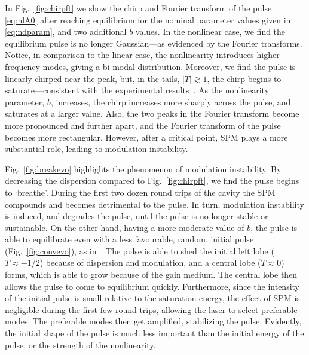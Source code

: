 \documentclass[9pt,twocolumn,twoside]{osajnl}
\begin{document}
In Fig.~\ref{fig:chirpft} we show the chirp and Fourier transform of the pulse \eqref{eq:nlA0} after reaching equilibrium for the nominal parameter values given in \eqref{eq:ndparam}, and two additional $b$ values. In the nonlinear case, we find the equilibrium pulse is no longer Gaussian---as evidenced by the Fourier transforms. Notice, in comparison to the linear case, the nonlinearity introduces higher frequency modes, giving a bi-modal distribution. Moreover, we find the pulse is linearly chirped near the peak, but, in the tails, $|T| \gtrsim 1$, the chirp begins to saturate---consistent with the experimental results~\cite{chen2008, rothenberg1989b, tomlinson1985}. As the nonlinearity parameter, $b$, increases, the chirp increases more sharply across the pulse, and saturates at a larger value. Also, the two peaks in the Fourier transform become more pronounced and further apart, and the Fourier transform of the pulse becomes more rectangular. However, after a critical point, SPM plays a more substantial role, leading to modulation instability.

Fig.~\ref{fig:breakevo} highlights the phenomenon of modulation instability. By decreasing the dispersion compared to Fig.~\ref{fig:chirpft}, we find the pulse begins to `breathe'. During the first two dozen round trips of the cavity the SPM compounds and becomes detrimental to the pulse. In turn, modulation instability is induced, and degrades the pulse, until the pulse is no longer stable or sustainable. On the other hand, having a more moderate value of $b$, the pulse is able to equilibrate even with a less favourable, random, initial pulse (Fig.~\ref{fig:convevo}), as in~\cite{meng2020}. The pulse is able to shed the initial left lobe ($T \approx -1 / 2$) because of dispersion and modulation, and a central lobe ($T \approx 0$) forms, which is able to grow because of the gain medium. The central lobe then allows the pulse to come to equilibrium quickly. Furthermore, since the intensity of the initial pulse is small relative to the saturation energy, the effect of SPM is negligible during the first few round trips, allowing the laser to select preferable modes. The preferable modes then get amplified, stabilizing the pulse. Evidently, the initial shape of the pulse is much less important than the initial energy of the pulse, or the strength of the nonlinearity.
\end{document}
